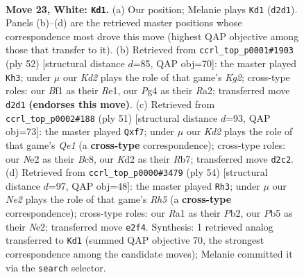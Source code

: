 \documentclass[11pt]{article}
\begin{document}
\clearpage

\begin{figure}[p]\centering
\begin{subfigure}{0.46\textwidth}\centering
\resizebox{\linewidth}{!}{%
\newchessgame
\chessboard[
  setfen={rnQ5/pp4kp/7p/1P1q2b1/3P2P1/4rP2/3KN3/R4B1R w - - 0 23},
  showmover=false,
  pgfstyle=straightmove, color=movearrow, markmove={d2-d1}
]}
\caption{}
\end{subfigure}\hfill
\begin{subfigure}{0.46\textwidth}\centering
\resizebox{\linewidth}{!}{%
\newchessgame
\chessboard[
  setfen={2r3k1/3n1rbp/1p2Q3/7p/3PpP1N/3q2P1/R2B2K1/4R3 w - - 0 27},
  showmover=false,
  pgfstyle=straightmove, color=movearrow, markmove={g2-h3}
]}
\caption{}
\end{subfigure}
\\[4pt]
\begin{subfigure}{0.46\textwidth}\centering
\resizebox{\linewidth}{!}{%
\newchessgame
\chessboard[
  setfen={2brq1k1/prR2Rp1/7p/8/1P1pP3/P2Q4/3B2PP/6K1 b - - 0 26},
  showmover=false,
  pgfstyle=straightmove, color=movearrow, markmove={e8-f7}
]}
\caption{}
\end{subfigure}\hfill
\begin{subfigure}{0.46\textwidth}\centering
\resizebox{\linewidth}{!}{%
\newchessgame
\chessboard[
  setfen={5k1r/1b2bpN1/p5qP/7R/1nQp1B2/3P4/1P2N3/4K3 w - - 1 28},
  showmover=false,
  pgfstyle=straightmove, color=movearrow, markmove={h5-h3}
]}
\caption{}
\end{subfigure}
\caption{\textbf{Move 23, White: \texttt{Kd1}.} (a) Our position; Melanie plays \texttt{Kd1} (\texttt{d2d1}). Panels (b)--(d) are the retrieved master positions whose correspondence most drove this move (highest QAP objective among those that transfer to it). (b) Retrieved from \texttt{ccrl\_top\_p0001\#1903} (ply 52) [structural distance $d$=85, QAP obj=70]: the master played \texttt{Kh3}; under $\mu$ our \emph{Kd2} plays the role of that game's \emph{Kg2}; cross-type roles: our \emph{B}f1 as their \emph{R}e1, our \emph{P}g4 as their \emph{R}a2; transferred move \texttt{d2d1} \textbf{(endorses this move)}. (c) Retrieved from \texttt{ccrl\_top\_p0002\#188} (ply 51) [structural distance $d$=93, QAP obj=73]: the master played \texttt{Qxf7}; under $\mu$ our \emph{Kd2} plays the role of that game's \emph{Qe1} (a \textbf{cross-type} correspondence); cross-type roles: our \emph{N}e2 as their \emph{B}c8, our \emph{K}d2 as their \emph{R}b7; transferred move \texttt{d2c2}. (d) Retrieved from \texttt{ccrl\_top\_p0000\#3479} (ply 54) [structural distance $d$=97, QAP obj=48]: the master played \texttt{Rh3}; under $\mu$ our \emph{Ne2} plays the role of that game's \emph{Rh5} (a \textbf{cross-type} correspondence); cross-type roles: our \emph{R}a1 as their \emph{P}b2, our \emph{P}b5 as their \emph{N}e2; transferred move \texttt{e2f4}. Synthesis: 1 retrieved analog transferred to \texttt{Kd1} (summed QAP objective 70, the strongest correspondence among the candidate moves); Melanie committed it via the \texttt{search} selector.}
\label{fig:thought-m44}
\end{figure}
\end{document}
